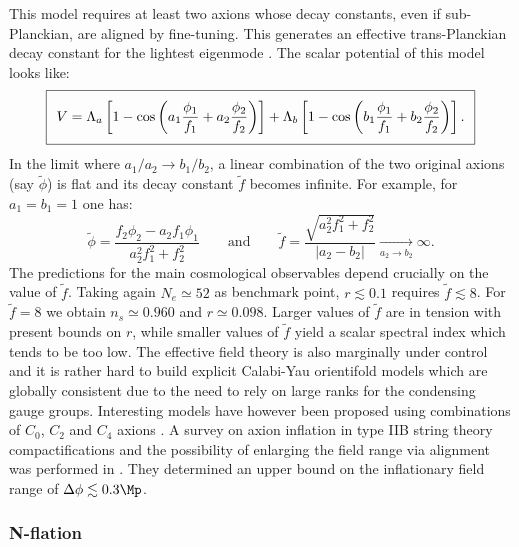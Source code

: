 This model requires at least two axions whose decay constants, even if sub-Planckian, are aligned by fine-tuning. This generates an effective trans-Planckian decay constant for the lightest eigenmode \cite{Kim:2004rp,Choi:2014rja,Kappl:2014lra}. The scalar potential of this model looks like:
\begin{equation}
\setlength\fboxsep{0.25cm}
\setlength\fboxrule{0.4pt}
\boxed{
V = \Lambda_a  \left[1-\cos\left(a_1\frac{\phi_1}{f_1}+a_2\frac{\phi_2}{f_2}\right)\right]  
+ \Lambda_b \left[1-\cos\left(b_1\frac{\phi_1}{f_1}+b_2\frac{\phi_2}{f_2}\right)\right].
}
\end{equation}
In the limit where $a_1/a_2 \to b_1/b_2$, a linear combination of the two original axions (say $\tilde{\phi}$) is flat and its decay constant $\tilde{f}$ becomes infinite. For example, for $a_1=b_1=1$ one has:
\begin{equation}
\tilde{\phi}= \frac{f_2\phi_2-a_2 f_1\phi_1}{a_2^2 f_1^2 + f_2^2}\qquad\text{and}\qquad\tilde{f}=\frac{\sqrt{a_2^2 f_1^2 + f_2^2}}{|a_2-b_2|} \xrightarrow[a_2\to b_2]{} \infty.
\end{equation}
The predictions for the main cosmological observables depend crucially on the value of $\tilde{f}$. Taking again $N_e\simeq 52$ as benchmark point, $r\lesssim 0.1$ requires $\tilde{f}\lesssim 8$. For $\tilde{f}=8$ we obtain $n_s\simeq 0.960$ and $r\simeq 0.098$. Larger values of $\tilde{f}$ are in tension with present bounds on $r$, while smaller values of $\tilde{f}$ yield a scalar spectral index which tends to be too low. The effective field theory is also marginally under control and it is rather hard to build explicit Calabi-Yau orientifold models which are globally consistent due to the need to rely on large ranks for the condensing gauge groups. Interesting models have however been proposed using combinations of $C_0$, $C_2$ and $C_4$ axions \cite{Higaki:2014pja,Ben-Dayan:2014zsa,Long:2014dta,Gao:2014uha,Li:2014lpa,Ben-Dayan:2014lca, Abe:2014xja, Angus:2021jpr}. A survey on axion inflation in  type IIB string theory compactifications and the possibility of  enlarging the field range via alignment was performed in \cite{Long:2016jvd}. They determined an upper bound on the inflationary field range of $\Delta\phi \lesssim 0.3\Mp$. 



\subsubsection*{N-flation}

